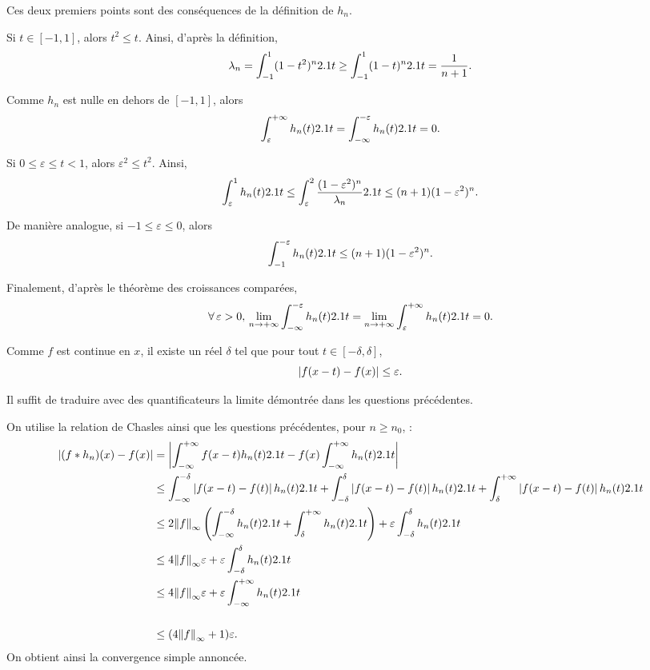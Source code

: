 \begin{demo}
\begin{questions}
\item Ces deux premiers points sont des conséquences de la définition de $h_n$.

\item Si $t \in [-1, 1]$, alors $t^2 \leq t$. Ainsi, d'après la définition,
\[
\lambda_n
= \int_{-1}^1 (1 - t^2)^n 2.1 t
\geq \int_{-1}^1 (1 - t)^n 2.1 t
= \frac{1}{n + 1}.
\]


\item Comme $h_n$ est nulle en dehors de $[-1, 1]$, alors 
\[
\int_\varepsilon^{+\infty} h_n(t) 2.1 t
= \int_{-\infty}^{-\varepsilon} h_n(t) 2.1 t
= 0.
\]

\item Si $0 \leq \varepsilon \leq t < 1$, alors $\varepsilon^2 \leq t^2$. Ainsi,
\[
\int_\varepsilon^1 h_n(t) 2.1 t
\leq \int_\varepsilon^2 \frac{(1 - \varepsilon^2)^n}{\lambda_n} 2.1 t
\leq (n + 1) (1 - \varepsilon^2)^n.
\]

De manière analogue, si $-1 \leq \varepsilon \leq 0$, alors
\[
\int_{-1}^{-\varepsilon} h_n(t) 2.1 t \leq (n + 1) (1 - \varepsilon^2)^n.
\]

\item Finalement, d'après le théorème des croissances comparées,
\[
\forall \varepsilon > 0,\,
\displaystyle\lim_{n\to+\infty} \int_{-\infty}^{-\varepsilon} h_n(t) \d t
= \displaystyle\lim_{n\to+\infty} \int_{\varepsilon}^{+\infty} h_n(t) \d t
= 0.
\]

\item Comme $f$ est continue en $x$, il existe un réel $\delta$ tel que pour tout $t \in [-\delta, \delta]$,
\[
\left| f(x - t) - f(x) \right| \leq \varepsilon.
\]

\item Il suffit de traduire avec des quantificateurs la limite démontrée dans les questions précédentes.

\item On utilise la relation de Chasles ainsi que les questions précédentes, pour $n \geq n_0$, :
\begin{align*}
\left| (f \ast h_n)(x) - f(x) \right|
&= \left| \int_{-\infty}^{+\infty} f(x - t) h_n(t) 2.1 t - f(x) \int_{-\infty}^{+\infty} h_n(t) 2.1 t \right|\\
&\leq
\int_{-\infty}^{-\delta} \left| f(x - t) - f(t) \right| h_n(t) 2.1 t
+ \int_{-\delta}^{\delta} \left| f(x - t) - f(t) \right| h_n(t) 2.1 t
+ \int_{\delta}^{+\infty} \left| f(x - t) - f(t) \right| h_n(t) 2.1 t\\
&\leq 2 \norm{f}_{\infty} \left(\int_{-\infty}^{-\delta} h_n(t) 2.1 t + \int_{\delta}^{+\infty} h_n(t) 2.1 t\right) + \varepsilon \int_{-\delta}^{\delta} h_n(t) 2.1 t\\
&\leq 4 \norm{f}_{\infty} \varepsilon + \varepsilon \int_{-\delta}^{\delta} h_n(t) 2.1 t\\
&\leq 4 \norm{f}_{\infty} \varepsilon + \varepsilon \int_{-\infty}^{+\infty} h_n(t) 2.1 t\\\\
&\leq (4 \norm{f}_\infty + 1) \varepsilon.
\end{align*}
On obtient ainsi la convergence simple annoncée.
\end{questions}
\end{demo}